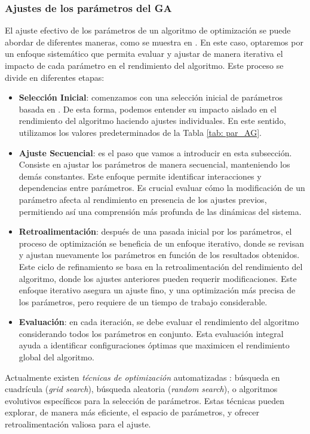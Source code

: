 \documentclass[12pt,a4paper]{book}
\begin{document}
\subsubsection{Ajustes de los parámetros del GA}
El ajuste efectivo de los parámetros de un algoritmo de optimización se puede abordar de diferentes maneras, como se muestra en \cite{garcia_sarmina_comparativa_2022}. En este caso, optaremos por un enfoque sistemático que permita evaluar y ajustar de manera iterativa el impacto de cada parámetro en el rendimiento del algoritmo. Este proceso se divide en diferentes etapas:
\begin{itemize}
	\item \textbf{Selección Inicial}: comenzamos con una selección inicial de parámetros basada en \cite{garcia_sarmina_comparativa_2022}. De esta forma, podemos entender su impacto aislado en el rendimiento del algoritmo haciendo ajustes individuales. En este sentido, utilizamos los valores predeterminados de la Tabla \ref{tab: par_AG}.
	\item \textbf{Ajuste Secuencial}: es el paso que vamos a introducir en esta subsección. Consiste en ajustar los parámetros de manera secuencial, manteniendo los demás constantes. Este enfoque permite identificar interacciones y dependencias entre parámetros. Es crucial evaluar cómo la modificación de un parámetro afecta al rendimiento en presencia de los ajustes previos, permitiendo así una comprensión más profunda de las dinámicas del sistema.
	\item \textbf{Retroalimentación}: después de una pasada inicial por los parámetros, el proceso de optimización se beneficia de un enfoque iterativo, donde se revisan y ajustan nuevamente los parámetros en función de los resultados obtenidos. Este ciclo de refinamiento se basa en la retroalimentación del rendimiento del algoritmo, donde los ajustes anteriores pueden requerir modificaciones. Este enfoque iterativo asegura un ajuste fino, y una optimización más precisa de los parámetros, pero requiere de un tiempo de trabajo considerable. 
	\item  \textbf{Evaluación}: en cada iteración, se debe evaluar el rendimiento del algoritmo considerando todos los parámetros en conjunto. Esta evaluación integral ayuda a identificar configuraciones óptimas que maximicen el rendimiento global del algoritmo.
\end{itemize}

Actualmente existen \textsl{técnicas de optimización} automatizadas \cite{sundhararajan_comparative_1998}: búsqueda en cuadrícula (\textsl{grid search}), búsqueda aleatoria (\textsl{random search}), o algoritmos evolutivos específicos para la selección de parámetros. Estas técnicas pueden explorar, de manera más eficiente, el espacio de parámetros, y ofrecer retroalimentación valiosa para el ajuste.
\end{document}
